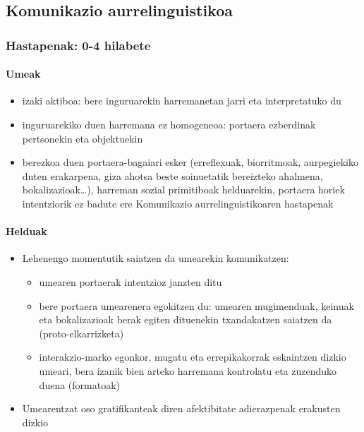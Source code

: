 \documentclass[
]{book}
\providecommand{\tightlist}{%
  \setlength{\itemsep}{0pt}\setlength{\parskip}{0pt}}
\begin{document}
\hypertarget{komunikazio-aurrelinguistikoa}{%
\subsection{Komunikazio aurrelinguistikoa}\label{komunikazio-aurrelinguistikoa}}

\hypertarget{hastapenak-0-4-hilabete}{%
\subsubsection{Hastapenak: 0-4 hilabete}\label{hastapenak-0-4-hilabete}}

\hypertarget{umeak}{%
\paragraph{Umeak}\label{umeak}}

\begin{itemize}
\tightlist
\item
  izaki aktiboa: bere inguruarekin harremanetan jarri eta interpretatuko du
\item
  inguruarekiko duen harremana ez homogeneoa: portaera ezberdinak pertsonekin eta objektuekin
\item
  berezkoa duen portaera-bagaiari esker (erreflexuak, biorritmoak, aurpegiekiko duten erakarpena, giza ahotsa beste soinuetatik bereizteko ahalmena, bokalizazioak\ldots), harreman sozial primitiboak helduarekin, portaera horiek intentziorik ez badute ere Komunikazio aurrelinguistikoaren hastapenak
\end{itemize}

\hypertarget{helduak}{%
\paragraph{Helduak}\label{helduak}}

\begin{itemize}
\tightlist
\item
  Lehenengo momentutik saiatzen da umearekin komunikatzen:

  \begin{itemize}
  \tightlist
  \item
    umearen portaerak intentzioz janzten ditu\\
  \item
    bere portaera umearenera egokitzen du: umearen mugimenduak, keinuak eta bokalizazioak berak egiten dituenekin txandakatzen saiatzen da (proto-elkarrizketa)\\
  \item
    interakzio-marko egonkor, mugatu eta errepikakorrak eskaintzen dizkio umeari, bera izanik bien arteko harremana kontrolatu eta zuzenduko duena (formatoak)
  \end{itemize}
\item
  Umearentzat oso gratifikanteak diren afektibitate adierazpenak erakusten dizkio
\end{itemize}
\end{document}
